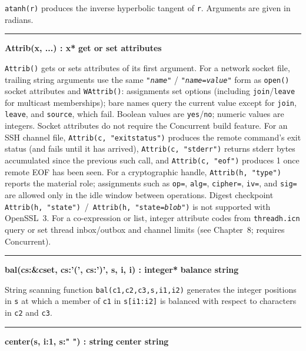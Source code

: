 \noindent
{}\texttt{atanh(r)} produces the inverse
hyperbolic tangent of \texttt{r}. Arguments are given in radians.

\bigskip
\hrule\vspace{0.1cm}
\noindent
{\bf Attrib(x, ...) : x* } \hfill {\bf get or set attributes}

\noindent
\texttt{Attrib()} gets or sets attributes of its first argument.
For a network socket file, trailing string arguments use the same
\texttt{"\textit{name}"} / \texttt{"\textit{name}=\textit{value}"} form
as \texttt{open()} socket attributes and \texttt{WAttrib()}: assignments
set options (including \texttt{join}/\texttt{leave} for multicast
memberships); bare names query the current value except for
\texttt{join}, \texttt{leave}, and \texttt{source}, which fail.
Boolean values are \texttt{yes}/\texttt{no}; numeric values are
integers. Socket attributes do not require the Concurrent build
feature.
For an SSH channel file, \texttt{Attrib(c, "exitstatus")} produces the
remote command's exit status (and fails until it has arrived),
\texttt{Attrib(c, "stderr")} returns stderr bytes accumulated since the
previous such call, and \texttt{Attrib(c, "eof")} produces 1 once remote
EOF has been seen.
For a cryptographic handle, \texttt{Attrib(h, "type")} reports the
material role; assignments such as \texttt{op=}, \texttt{alg=},
\texttt{cipher=}, \texttt{iv=}, and \texttt{sig=} are allowed only in
the idle window between operations. Digest checkpoint
\texttt{Attrib(h, "state")}~/~\texttt{Attrib(h, "state=\textit{blob}")}
is not supported with OpenSSL~3.
For a co-expression or list, integer attribute codes from
\texttt{threadh.icn} query or set thread inbox/outbox and channel limits
(see Chapter~8; requires Concurrent).

\bigskip
\hrule\vspace{0.1cm}
\noindent
{\bf bal(cs:\&cset, cs:'(', cs:')', s, i, i) : integer* } \hfill {\bf balance string}

\noindent
{}String scanning function
\texttt{bal(c1,c2,c3,s,i1,i2)} generates the integer positions in
\texttt{s} at which a member of \texttt{c1} in \texttt{s[i1:i2]} is
balanced with respect to characters in \texttt{c2} and \texttt{c3}.

\bigskip
\hrule\vspace{0.1cm}
\noindent
{\bf center(s, i:1, s:" ") : string } \hfill {\bf center string}

